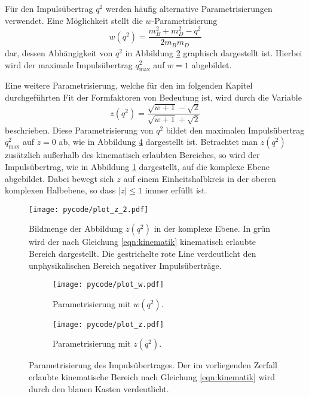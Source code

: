 Für den Impulsübertrag $q^2$ werden häufig alternative Parametrisierungen verwendet.
Eine Möglichkeit stellt die $w$-Parametrisierung
\begin{equation}
  w(q^2) = \frac{m_B^2 + m_D^2 - q^2}{2 m_B m_D}
\end{equation}
dar, dessen Abhängigkeit von $q^2$ in Abbildung \ref{fig:w_param} graphisch dargestellt ist.
Hierbei wird der maximale Impulsübertrag $q_\text{max}^2$ auf $w=1$ abgebildet.

Eine weitere Parametrisierung, welche für den im folgenden Kapitel durchgeführten Fit der Formfaktoren von Bedeutung ist, wird durch die Variable
\begin{equation}
  z(q^2) = \frac{\sqrt{w+1}-\sqrt{2}}{\sqrt{w+1}+\sqrt{2}}
\end{equation}
beschrieben.
Diese Parametrisierung von $q^2$ bildet den maximalen Impulsübertrag $q_\text{max}^2$ auf $z=0$ ab, wie in Abbildung \ref{fig:z_param} dargestellt ist.
Betrachtet man $z(q^2)$ zusätzlich außerhalb des kinematisch erlaubten Bereiches, so wird der Impulsübertrag, wie in Abbildung \ref{fig:z_kreis} dargestellt, auf die komplexe Ebene abgebildet.
Dabei bewegt sich $z$ auf einem Einheitshalbkreis in der oberen komplexen Halbebene, so dass $\lvert z \rvert \leq \num{1}$ immer erfüllt ist.
\begin{figure}
  \centering
  \texttt{[image: pycode/plot\_z\_2.pdf]}
  \caption{Bildmenge der Abbildung $z(q^2)$ in der komplexe Ebene. In grün wird der nach Gleichung \eqref{eqn:kinematik} kinematisch erlaubte Bereich dargestellt. Die gestrichelte rote Line verdeutlicht den unphysikalischen Bereich negativer Impulsüberträge.}
  \label{fig:z_kreis}
\end{figure}

\begin{figure}
  \centering
  \begin{subfigure}{0.48\textwidth}
    \centering
    \texttt{[image: pycode/plot\_w.pdf]}
    \caption{Parametrisierung mit $w(q^2)$.}
    \label{fig:w_param}
  \end{subfigure}
  \begin{subfigure}{0.48\textwidth}
    \centering
    \texttt{[image: pycode/plot\_z.pdf]}
    \caption{Parametrisierung mit $z(q^2)$.}
    \label{fig:z_param}
  \end{subfigure}
  \caption{Parametrisierung des Impulsübertrages. Der im vorliegenden Zerfall erlaubte kinematische Bereich nach Gleichung \eqref{eqn:kinematik} wird durch den blauen Kasten verdeutlicht.}
\end{figure}
